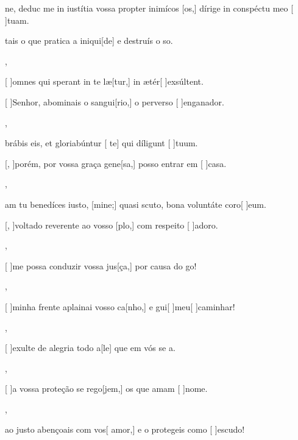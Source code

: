 {  {\item {}ne, deduc me in iustítia vossa propter inimícos [os,] dírige in conspéctu meo [ ]tuam.~\Antiphona}%
    {\item {}tais o que pratica a iniqui[de] e destruís o so.~\Antiphona},
  {\item {}[ ]{om}nes qui sperant in te læ[tur,] in ætér[ ]{ex}{súl}\-tent.~\Antiphona}%
    {\item {}[ ]{Se}nhor, abominais o sangui[rio,] o perverso [ ]{en}{ga}nador.~\Antiphona},
  {\item {}brábis eis, et gloriabúntur [ te] qui díligunt [ ]{tu}um.~\Antiphona}%
    {\item {}[, ]{po}rém, por vossa graça gene[sa,] posso entrar em [ ]{ca}sa.~\Antiphona},
  {\item {}am tu benedíces iusto, [mine;] quasi scuto, bona voluntáte coro[ ]{e}um.~\Antiphona}%
    {\item {}[, ]{vol}tado reverente ao vosso [plo,] com respeito [ ]{a}{do}ro.~\Antiphona},
  {~\Antiphona}%
    {\item {}[ ]{me} possa conduzir vossa jus[ça,] por causa do go!~\Antiphona},
  {~\Antiphona}%
    {\item {}[ ]{mi}nha frente aplainai vosso ca[nho,] e gui[ ]{meu}[ ]{ca}minhar!~\Antiphona},
  {~\Antiphona}%
    {\item {}[ ]{e}xulte de alegria todo a[le] que em vós se a.~\Antiphona},
  {~\Antiphona}%
    {\item {}[ ]{a} vossa proteção se rego[jem,] os que amam [ ]{no}me.~\Antiphona},
  {~\Antiphona}%
    {\item {} ao justo abençoais com vos[ amor,] e o protegeis como [ ]{es}{cu}do!~\Antiphona}
}